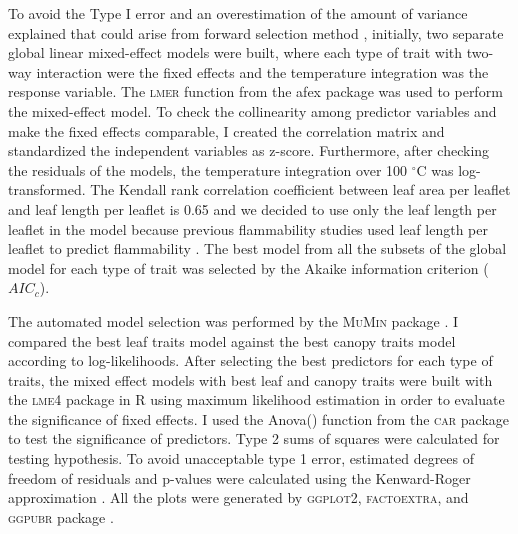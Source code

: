 \documentclass{ttuthes2007}
\newcommand{\pkg}[1]{\textsc{#1}}
\begin{document}

\noindent To avoid the  Type I error and an overestimation of the amount of variance explained that could arise from forward selection method \citep{blanchet2008forward}, initially, two separate global linear mixed-effect models were built, where each type of trait with two-way interaction were the fixed effects and the temperature integration was the response variable.
The \pkg{lmer} function from the afex package \citep{singmann2015packageafex,afexluke2017evaluating} was used to perform the mixed-effect model.
To check the collinearity among predictor variables and make the fixed effects comparable, I created the correlation matrix and standardized the independent variables as z-score. Furthermore, after checking the residuals of the models, the temperature integration over 100 $^{\circ}$C was log-transformed. 
The Kendall rank correlation coefficient between leaf area per leaflet and leaf length per leaflet is 0.65 and we decided to use only the leaf length per leaflet in the model because previous flammability studies used leaf length per leaflet to predict flammability \citep{alam2020shoot}. 
The best model from all the subsets of the global model for each type of trait was selected by the Akaike information criterion ($AIC_{c}$).

\noindent The automated model selection was performed by the \pkg{MuMin} package \citep{barton2015packagemumin}. I compared the best leaf traits model against the best canopy traits model according to log-likelihoods. After selecting the best predictors for each type of traits, the mixed effect models with best leaf and canopy traits were built with the \pkg{lme4} package in R \citep{bates2009package} using maximum likelihood estimation in order to evaluate the significance of fixed effects. I used the Anova() function from the \pkg{car} package \citep{fox2013hypothesis} to test the significance of predictors. Type  2  sums  of  squares  were  calculated  for  testing  hypothesis. To avoid unacceptable type 1 error, estimated degrees of freedom of residuals and p-values were calculated using the Kenward-Roger approximation \citep{kenward1997small}. All the plots were generated by \pkg{ggplot2}, \pkg{factoextra}, and \pkg{ggpubr} package \citep{wickham2016packageggplot2, kassambara2017packagefactoextra,kassambara2020package}.
\end{document}
